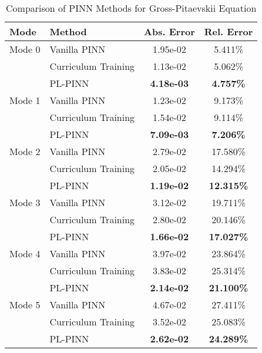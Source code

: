 \begin{table}[htbp]
\centering
\caption{Comparison of PINN Methods for Gross-Pitaevskii Equation}
\label{tab:pinn_comparison}
\begin{tabular}{llcc}
\toprule
Mode & Method & Abs. Error & Rel. Error \\
\midrule
Mode 0 & Vanilla PINN & 1.95e-02 & 5.411\% \\
 & Curriculum Training & 1.13e-02 & 5.062\% \\
 & PL-PINN & \textbf{4.18e-03} & \textbf{4.757\%} \\
\midrule
Mode 1 & Vanilla PINN & 1.23e-02 & 9.173\% \\
 & Curriculum Training & 1.54e-02 & 9.114\% \\
 & PL-PINN & \textbf{7.09e-03} & \textbf{7.206\%} \\
\midrule
Mode 2 & Vanilla PINN & 2.79e-02 & 17.580\% \\
 & Curriculum Training & 2.05e-02 & 14.294\% \\
 & PL-PINN & \textbf{1.19e-02} & \textbf{12.315\%} \\
\midrule
Mode 3 & Vanilla PINN & 3.12e-02 & 19.711\% \\
 & Curriculum Training & 2.80e-02 & 20.146\% \\
 & PL-PINN & \textbf{1.66e-02} & \textbf{17.027\%} \\
\midrule
Mode 4 & Vanilla PINN & 3.97e-02 & 23.864\% \\
 & Curriculum Training & 3.83e-02 & 25.314\% \\
 & PL-PINN & \textbf{2.14e-02} & \textbf{21.100\%} \\
\midrule
Mode 5 & Vanilla PINN & 4.67e-02 & 27.411\% \\
 & Curriculum Training & 3.52e-02 & 25.083\% \\
 & PL-PINN & \textbf{2.62e-02} & \textbf{24.289\%} \\
\bottomrule
\end{tabular}
\end{table}